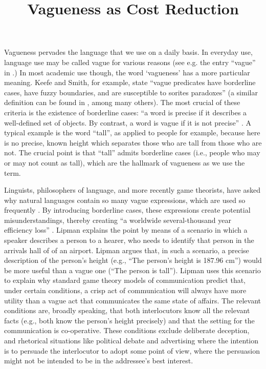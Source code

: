 \documentclass[
a4paper 
, doc
, longtable
]{apa6}
\title{Vagueness as Cost Reduction}
\begin{document}
\longdate
\maketitle %
Vagueness pervades the language that we use on a daily basis. In everyday use, language use may be called vague for various reasons (see e.g. the entry ``vague'' in \cite{penguin}.) 
In most academic use though, the word `vagueness' has a more particular meaning. Keefe and Smith, for example, state ``vague predicates have borderline cases, have fuzzy boundaries, and are susceptible to sorites paradoxes'' \cite[p.\ 4]{keefe1997vagueness} (a similar definition can be found in \textcite{EgreKlinedinst}, among many others).  The most crucial of these criteria is the existence of borderline cases: ``a word is precise if it describes a well-defined set of objects. By contrast, a word is vague if it is not precise'' \cite[p.\ 1]{lipmanvague}. A typical example is the word ``tall'', as applied to people for example, because here is no precise, known height which separates those who are tall from those who are not. The crucial point is that ``tall'' admits borderline cases (i.e., people who may or may not count as tall), which are the hallmark of vagueness as we use the term.

Linguists, philosophers of language, and more recently game theorists, have asked why natural languages contain so many vague expressions, which are used so frequently \cite{Lipman:2000fk, lipmanvague}. By introducing borderline cases, these expressions create potential misunderstandings, thereby creating ``a worldwide several-thousand year efficiency loss'' \cite[][p.~1]{lipmanvague}. Lipman explains the point by means of a scenario in which a speaker describes a person to a hearer, who needs to identify that person in the arrivals hall of of an airport. Lipman argues that, in such a scenario, a precise description of the person's height (e.g., ``The person's height is 187.96 cm'') would be more useful than a vague one (``The person is tall''). Lipman uses this scenario to explain why standard game theory models of communication \cite[e.g.,]{Crawford:1982lr} predict that, under certain conditions, a crisp act of communication will always have more utility than a vague act that communicates the same state of affairs. The relevant conditions are, broadly speaking, that both interlocutors know all the relevant facts (e.g., both know the person's height precisely) and that the setting for the communication is co-operative. These conditions exclude deliberate deception, and rhetorical situations like political debate and advertising where the intention is to persuade the interlocutor to adopt some point of view, where the persuasion might not be intended to be in the addressee's best interest. 
\end{document}
